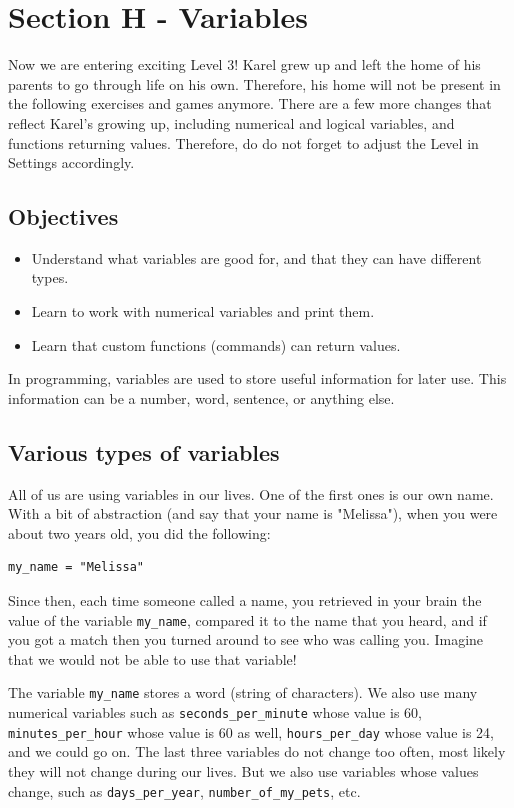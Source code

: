 \documentclass[article,A4,12pt]{llncs}
\begin{document}
{{{{\section{Section H - Variables}

Now we are entering exciting Level 3! Karel grew up and left the home of his 
parents to go through life on his own. Therefore, his home will not be present
in the following exercises and games anymore. There are a few more changes
that reflect Karel's growing up, including numerical and logical variables,
and functions returning values. Therefore, do do not forget to adjust the 
Level in Settings accordingly.

\subsection{Objectives} 
 
\begin{itemize}
\item Understand what variables are good for, and that they can have different types.
\item Learn to work with numerical variables and print them.
\item Learn that custom functions (commands) can return values. 
\end{itemize}

\noindent
In programming, variables are used to store useful information for later use. This information can 
be a number, word, sentence, or anything else. 

\subsection{Various types of variables}

All of us are using variables in our lives. One of 
the first ones is our own name. With a bit of abstraction (and say that your name is "Melissa"), 
when you were about two years old, you did the following:

\begin{verbatim}
my_name = "Melissa"
\end{verbatim}
Since then, each time someone called a name, you retrieved in your brain the value of the variable
{\tt my\_name}, compared it to the name that you heard, and if you got a match then you turned around 
to see who was calling you. Imagine that we would not be able to use that variable!

The variable {\tt my\_name} stores a word (string of characters). We also use many numerical variables such as
{\tt seconds\_per\_minute} whose value is 60, {\tt minutes\_per\_hour} whose value is 60 as well, 
{\tt hours\_per\_day} whose value is 24, and we could go on. The last three variables do not change 
too often, most likely they will not change during our lives. But we also use variables whose 
values change, such as {\tt days\_per\_year}, {\tt number\_of\_my\_pets}, etc.

}}}}
\end{document}
